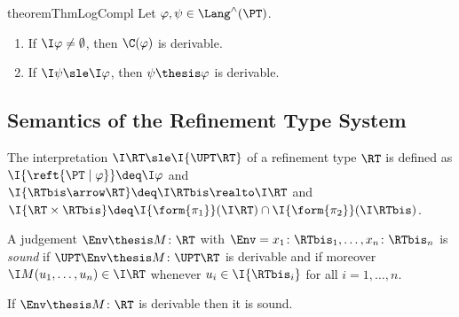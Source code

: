 \begin{restatable}{theorem}{ThmLogCompl}
\label{thm:sem:log:compl}
Let $\varphi, \psi \in \Lang^\land(\PT)$.
\begin{enumerate}[(1)]
\item
\label{item:sem:log:compl:consist}
If $\I\varphi \neq \emptyset$, then $\C(\varphi)$ is derivable.

\item
\label{item:sem:log:compl:ded}
If $\I\psi \sle \I\varphi$,
then $\psi \thesis \varphi$ is derivable.
\end{enumerate}
\end{restatable}


\subsection{Semantics of the Refinement Type System}
\label{sec:sem:reft}
The interpretation $\I\RT \sle \I{\UPT\RT}$
of a refinement type $\RT$ is defined as
$\I{\reft{\PT \mid \varphi}} \deq \I\varphi$
and
$\I{\RTbis \arrow \RT} \deq \I\RTbis \realto \I\RT$
and
$\I{\RT \times \RTbis} \deq \I{\form{\pi_1}}(\I\RT) \cap \I{\form{\pi_2}}(\I\RTbis)$.

\begin{definition}
\label{def:sound:typing}
A judgement $\Env \thesis M \colon \RT$ with
$\Env = x_1\colon\RTbis_1, \dots, x_n\colon\RTbis_n$
is \emph{sound} if $\UPT\Env \thesis M \colon \UPT\RT$ is derivable and
if moreover $\I M(u_1,\dots,u_n) \in \I\RT$
whenever $u_i \in \I{\RTbis_i}$ for all $i = 1,\dots,n$.
\end{definition}

\begin{theorem}
\label{thm:sem:sound:reft}
If $\Env \thesis M \colon \RT$ is derivable then it is sound.
\end{theorem}

